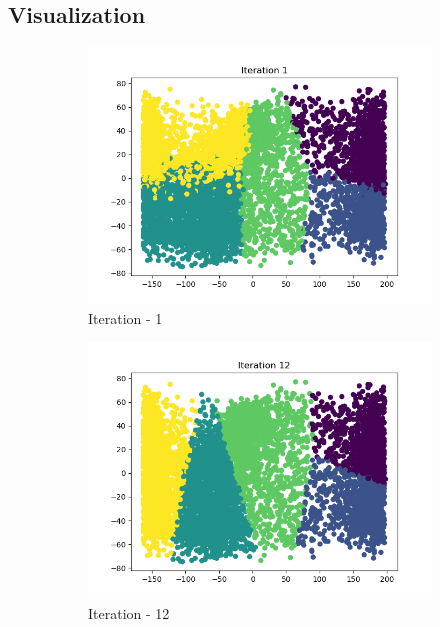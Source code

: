 \documentclass[12pt]{article}
\begin{document}
\subsection{Visualization}
\begin{figure}[H]
	\centering
	\begin{subfigure}{0.45\linewidth}
		\includegraphics[scale=0.45]{km/1.png}
		\caption{Iteration - 1}
	\end{subfigure}%
	\begin{subfigure}{0.45\linewidth}
	\includegraphics[scale=0.45]{km/12.png}
	\caption{Iteration - 12}
	\end{subfigure}%
\hspace{5cm}
	\begin{subfigure}{0.45\linewidth}

\end{subfigure}
\end{figure}
\end{document}
